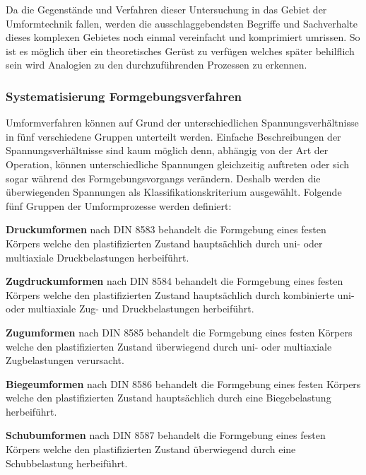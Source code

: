 \documentclass[12pt,a4paper,parskip,twoside,BCOR5mm,headsepline]{scrartcl}
\begin{document}
\begin{description*}
{Da die Gegenstände und Verfahren dieser Untersuchung in das Gebiet der Umformtechnik fallen, werden die ausschlaggebendsten Begriffe und Sachverhalte dieses komplexen Gebietes noch einmal vereinfacht und komprimiert umrissen. So ist es möglich über ein theoretisches Gerüst zu verfügen welches später behilflich sein wird   Analogien zu den durchzuführenden Prozessen zu erkennen.
\subsubsection{Systematisierung Formgebungsverfahren}
Umformverfahren können
auf Grund der unterschiedlichen Spannungsverhältnisse in fünf verschiedene Gruppen unterteilt werden. Einfache Beschreibungen der Spannungsverhältnisse sind kaum möglich denn,  abhängig von der Art der Operation, können  unterschiedliche Spannungen gleichzeitig auftreten oder sich sogar  während des Formgebungsvorgangs verändern. Deshalb werden die überwiegenden Spannungen als Klassifikationskriterium ausgewählt. Folgende fünf Gruppen der Umformprozesse werden definiert:
\begin{enumerate*}
\item \textbf{Druckumformen} nach DIN 8583 behandelt die Formgebung eines festen Körpers  welche den  plastifizierten  Zustand hauptsächlich durch uni- oder multiaxiale Druckbelastungen herbeiführt.
\item \textbf{Zugdruckumformen} nach DIN 8584 behandelt die Formgebung eines festen Körpers  welche den plastifizierten Zustand  hauptsächlich durch kombinierte uni- oder multiaxiale Zug- und Druckbelastungen herbeiführt.
\item \textbf{Zugumformen} nach DIN 8585 behandelt die Formgebung eines festen Körpers welche den plastifizierten Zustand überwiegend durch uni- oder multiaxiale Zugbelastungen verursacht.
\item \textbf{Biegeumformen} nach DIN 8586 behandelt die Formgebung eines festen Körpers welche den plastifizierten Zustand hauptsächlich durch eine Biegebelastung herbeiführt.
\item \textbf{Schubumformen} nach DIN 8587 behandelt die Formgebung eines festen Körpers welche den plastifizierten Zustand überwiegend durch eine Schubbelastung herbeiführt.

\end{enumerate*}

}
\end{description*}
\end{document}
